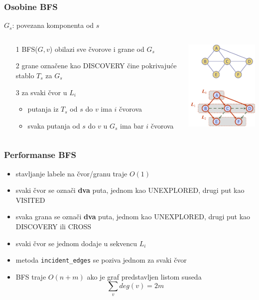 \documentclass[compress,aspectratio=169]{beamer}
\begin{document}
\begin{frame}[fragile]
  \frametitle{Osobine BFS}
  $G_{s}$: povezana komponenta od $s$
  \begin{columns}
    \begin{column}[t]{9cm}
      \begin{itemize}
        \item[1] BFS($G,v$) obilazi sve čvorove i grane od $G_{s}$
        \item[2] grane označene kao {\scriptsize DISCOVERY} čine 
          pokrivajuće stablo $T_{s}$ za $G_{s}$
        \item[3] za svaki čvor u $L_{i}$
        \begin{itemize}
          \item putanja iz $T_{s}$ od $s$ do $v$ ima $i$ čvorova
          \item svaka putanja od $s$ do $v$ u $G_{s}$ ima bar $i$ čvorova
        \end{itemize}
      \end{itemize}
    \end{column}
    \begin{column}[t]{6cm}
      \begin{center}
        \includegraphics[width=4.5cm]{asp-14-pic25.png}
      \end{center}
    \end{column}
  \end{columns}
\end{frame}

\begin{frame}[fragile]
  \frametitle{Performanse BFS}
  \begin{itemize}
    \item stavljanje labele na čvor/granu traje $O(1)$
    \item svaki čvor se označi \textbf{dva} puta, jednom kao {\scriptsize 
      UNEXPLORED}, drugi put kao {\scriptsize VISITED}
    \item svaka grana se označi \textbf{dva} puta, jednom kao {\scriptsize 
      UNEXPLORED}, drugi put kao {\scriptsize DISCOVERY} ili 
      {\scriptsize CROSS}
    \item svaki čvor se jednom dodaje u sekvencu $L_{i}$
    \item metoda \texttt{incident\_edges} se poziva jednom za svaki čvor
    \item BFS traje $O(n+m)$ ako je graf predstavljen listom suseda
    $$\sum_{v}deg(v)=2m$$
  \end{itemize}
\end{frame}
\end{document}
